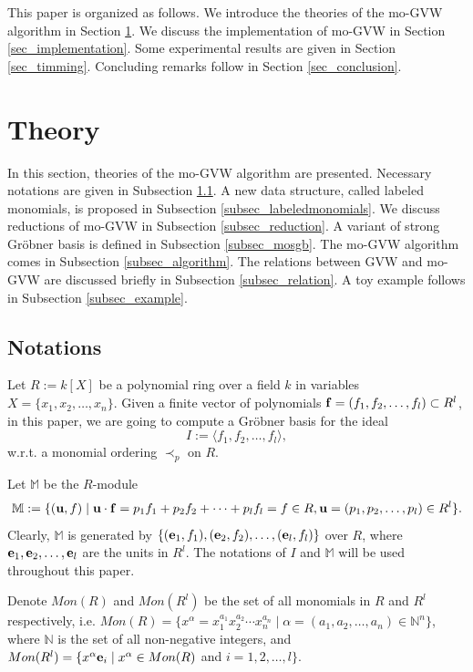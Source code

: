 \documentclass[final, number, 3p,12pt]{elsarticle}
\def\N{{\mathbb{N}}}
\def\M{{\mathbb M}}
\def\f{{\bf f}}
\def\e{{\bf e}}
\def\u{{\bf u}}
\begin{document}
This paper is organized as follows. We introduce the theories of the mo-GVW algorithm in Section \ref{sec_theory}. We discuss the implementation of mo-GVW in Section \ref{sec_implementation}. Some experimental results are given in Section \ref{sec_timming}. Concluding remarks follow in Section \ref{sec_conclusion}.





\section{Theory} \label{sec_theory}

In this section, theories of the mo-GVW algorithm are presented. Necessary notations are given in Subsection \ref{subsec_notations}. A new data structure, called labeled monomials, is proposed in Subsection \ref{subsec_labeledmonomials}. We discuss reductions of mo-GVW in Subsection \ref{subsec_reduction}. A variant of strong Gr\"obner basis is defined in Subsection \ref{subsec_mosgb}. The mo-GVW algorithm comes in Subsection \ref{subsec_algorithm}. The relations between GVW and mo-GVW are discussed briefly in Subsection \ref{subsec_relation}. A toy example follows in Subsection \ref{subsec_example}.


\subsection{Notations} \label{subsec_notations}


Let $R:= k[X]$ be a polynomial ring over a field $k$ in variables $X = \{x_1, x_2, \ldots, x_n\}$. Given a finite vector of polynomials $\f = (f_1, f_2, \ldots, f_l) \subset R^l$, in this paper, we are going to compute a Gr\"obner basis for the ideal $$I:=\langle f_1, f_2, \ldots, f_l\rangle,$$ w.r.t. a monomial ordering $\prec_p$ on $R$.


Let $\M$ be the $R$-module $$\M:=\{(\u, f) \mid \u \cdot \f = p_1f_1+p_2f_2+\cdots+p_lf_l = f\in R, \u = (p_1, p_2, \ldots, p_l) \in R^l\}.$$ Clearly, $\M$ is generated by $\{(\e_1, f_1), (\e_2, f_2), \ldots, (\e_l, f_l)\}$ over $R$, where $\e_1, \e_2, \ldots, \e_l$ are the units in $R^l$. The notations of $I$ and $\M$ will be used throughout this paper.

Denote $Mon(R)$ and $Mon(R^l)$ be the set of all monomials in $R$ and $R^l$ respectively, i.e. $Mon(R) = \{x^\alpha = x_1^{a_1}x_2^{a_2}\cdots x_n^{a_n} \mid \alpha = (a_1, a_2, \ldots, a_n) \in \N^n\}$, where $\N$ is the set of all non-negative integers,  and $Mon(R^l) =\{x^\alpha\e_i \mid x^\alpha \in Mon(R)$ and $i = 1, 2, \ldots, l\}$.
\end{document}
